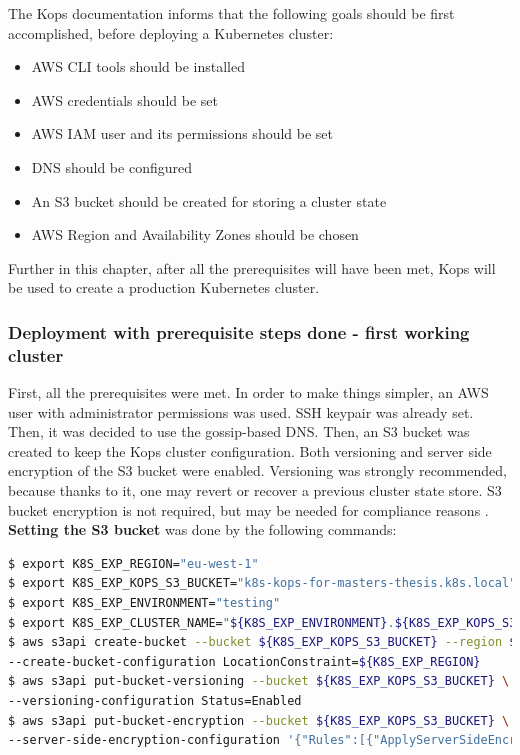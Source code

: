 The Kops documentation \cite{online-kops-aws} informs that the following goals should be first accomplished, before deploying a Kubernetes cluster:
\begin{itemize}
\item AWS CLI tools should be installed
\item AWS credentials should be set
\item AWS IAM user and its permissions should be set
\item DNS should be configured
\item An S3 bucket should be created for storing a cluster state
\item AWS Region and Availability Zones should be chosen
\end{itemize}

Further in this chapter, after all the prerequisites will have been met, Kops will be used to create a production Kubernetes cluster.

\subsubsection{Deployment with prerequisite steps done - first working cluster}

First, all the prerequisites were met. In order to make things simpler, an AWS user with administrator permissions was used. SSH keypair was already set. Then, it was decided to use the gossip-based DNS. Then, an S3 bucket was created to keep the Kops cluster configuration. Both versioning and server side encryption of the S3 bucket were enabled. Versioning was strongly recommended, because thanks to it, one may revert or recover a previous cluster state store. S3 bucket encryption is not required, but may be needed for compliance reasons \cite{online-kops-aws}. \textbf{Setting the S3 bucket} was done by the following commands:
\begin{lstlisting}[basicstyle=\tiny,caption={Commands used to set an AWS S3 bucket for Kops},captionpos=b,language=Bash,xleftmargin=1cm]
$ export K8S_EXP_REGION="eu-west-1"
$ export K8S_EXP_KOPS_S3_BUCKET="k8s-kops-for-masters-thesis.k8s.local"
$ export K8S_EXP_ENVIRONMENT="testing"
$ export K8S_EXP_CLUSTER_NAME="${K8S_EXP_ENVIRONMENT}.${K8S_EXP_KOPS_S3_BUCKET}"
$ aws s3api create-bucket --bucket ${K8S_EXP_KOPS_S3_BUCKET} --region ${K8S_EXP_REGION} \
--create-bucket-configuration LocationConstraint=${K8S_EXP_REGION}
$ aws s3api put-bucket-versioning --bucket ${K8S_EXP_KOPS_S3_BUCKET} \
--versioning-configuration Status=Enabled
$ aws s3api put-bucket-encryption --bucket ${K8S_EXP_KOPS_S3_BUCKET} \
--server-side-encryption-configuration '{"Rules":[{"ApplyServerSideEncryptionByDefault":{"SSEAlgorithm":"AES256"}}]}'
\end{lstlisting}

